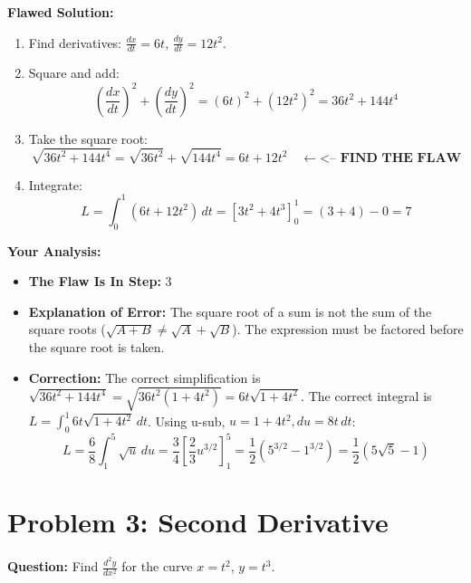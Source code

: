 \documentclass{article}
\begin{document}
\textbf{Flawed Solution:}
\begin{enumerate}
    \item Find derivatives: $\frac{dx}{dt} = 6t$, $\frac{dy}{dt} = 12t^2$.
    \item Square and add:
    \[ (\frac{dx}{dt})^2 + (\frac{dy}{dt})^2 = (6t)^2 + (12t^2)^2 = 36t^2 + 144t^4 \]
    \item Take the square root:
    \[ \sqrt{36t^2 + 144t^4} = \sqrt{36t^2} + \sqrt{144t^4} = 6t + 12t^2 \quad \longleftarrow \textbf{<-- FIND THE FLAW} \]
    \item Integrate:
    \[ L = \int_0^1 (6t + 12t^2) \, dt = \left[3t^2 + 4t^3\right]_0^1 = (3+4) - 0 = 7 \]
\end{enumerate}
\textbf{Your Analysis:}
\begin{itemize}
    \item \textbf{The Flaw Is In Step:} 3
    \item \textbf{Explanation of Error:} The square root of a sum is not the sum of the square roots ($\sqrt{A+B} \neq \sqrt{A} + \sqrt{B}$). The expression must be factored before the square root is taken.
    \item \textbf{Correction:}
    The correct simplification is $\sqrt{36t^2 + 144t^4} = \sqrt{36t^2(1+4t^2)} = 6t\sqrt{1+4t^2}$.
    The correct integral is $L = \int_0^1 6t\sqrt{1+4t^2} \, dt$.
    Using u-sub, $u=1+4t^2, du=8t \, dt$:
    \[ L = \frac{6}{8}\int_1^5 \sqrt{u} \, du = \frac{3}{4} \left[\frac{2}{3}u^{3/2}\right]_1^5 = \frac{1}{2}(5^{3/2} - 1^{3/2}) = \frac{1}{2}(5\sqrt{5}-1) \]
\end{itemize}

\section{Problem 3: Second Derivative}
\textbf{Question:} Find $\frac{d^2y}{dx^2}$ for the curve $x = t^2$, $y=t^3$.
\end{document}
